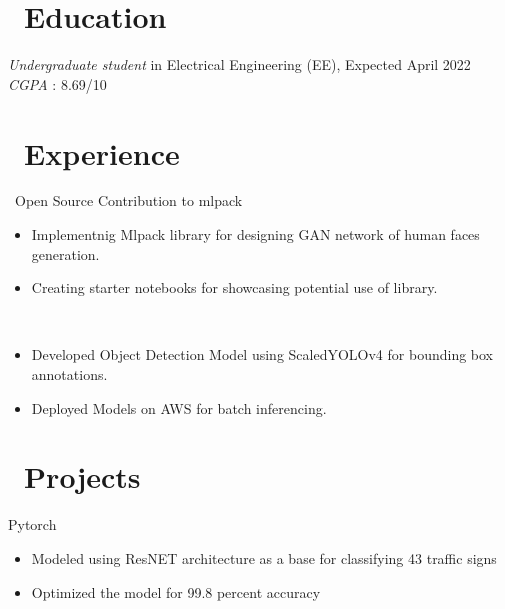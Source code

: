 \documentclass{resume}
\begin{document}



\section{\faGraduationCap\ Education}
\textit{Undergraduate student} in Electrical Engineering (EE), Expected April 2022 \\
\textit {CGPA} : 8.69/10

\section{\faUsers\ Experience}
\role{Student Developer} 
\ Open Source Contribution to mlpack
\begin{itemize}
  \item Implementnig Mlpack library for designing GAN network of human faces generation. 
  \item Creating starter notebooks for showcasing potential use of library. 
\end{itemize}

\
\begin{itemize}
  \item Developed Object Detection Model using ScaledYOLOv4 for bounding box annotations.
  \item Deployed Models on AWS for batch inferencing.
\end{itemize}

\section{\faGraduationCap\ Projects}
Pytorch
\begin{itemize}
  \item Modeled using ResNET architecture as a base for classifying 43 traffic signs
  \item Optimized the model for 99.8 percent accuracy
\end{itemize}
\end{document}
